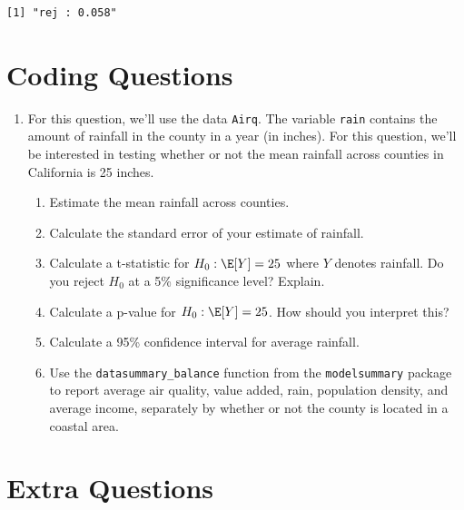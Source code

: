 \documentclass[
  letterpaper,
  DIV=11,
  numbers=noendperiod]{scrreprt}
\begin{document}
\begin{verbatim}
[1] "rej : 0.058"
\end{verbatim}

\section{Coding Questions}\label{coding-questions-1}

\begin{enumerate}
\def\labelenumi{\arabic{enumi}.}
\item
  For this question, we'll use the data \texttt{Airq}. The variable
  \texttt{rain} contains the amount of rainfall in the county in a year
  (in inches). For this question, we'll be interested in testing whether
  or not the mean rainfall across counties in California is 25 inches.

  \begin{enumerate}
  \def\labelenumii{\alph{enumii})}
  \item
    Estimate the mean rainfall across counties.
  \item
    Calculate the standard error of your estimate of rainfall.
  \item
    Calculate a t-statistic for \(H_0 : \E[Y] = 25\) where \(Y\) denotes
    rainfall. Do you reject \(H_0\) at a 5\% significance level?
    Explain.
  \item
    Calculate a p-value for \(H_0: \E[Y] = 25\). How should you
    interpret this?
  \item
    Calculate a 95\% confidence interval for average rainfall.
  \item
    Use the \texttt{datasummary\_balance} function from the
    \texttt{modelsummary} package to report average air quality, value
    added, rain, population density, and average income, separately by
    whether or not the county is located in a coastal area.
  \end{enumerate}
\end{enumerate}

\section{Extra Questions}\label{extra-questions-1}
\end{document}
